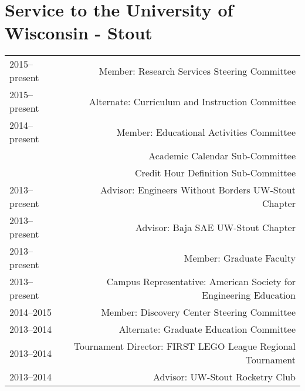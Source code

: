 \section*{Service to the University of Wisconsin - Stout}
\begin{tabular}{L!{\VRule}R}
2015--present&Member: Research Services Steering Committee \\
2015--present&Alternate: Curriculum and Instruction Committee \\
2014--present&Member: Educational Activities Committee \\
 &Academic Calendar Sub-Committee \\
 &Credit Hour Definition Sub-Committee \\
2013--present&Advisor: Engineers Without Borders UW-Stout Chapter \\
2013--present&Advisor: Baja SAE UW-Stout Chapter \\
2013--present&Member: Graduate Faculty \\
2013--present&Campus Representative: American Society for Engineering Education\\
2014--2015&Member: Discovery Center Steering Committee \\
2013--2014&Alternate: Graduate Education Committee \\
2013--2014&Tournament Director: FIRST LEGO League Regional Tournament\\
2013--2014&Advisor: UW-Stout Rocketry Club\\
\end{tabular}